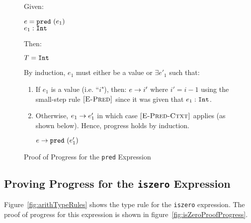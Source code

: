 \documentclass{report}
\newcommand{\rel}[1]{\mbox{\sc [#1]}}
\begin{document}
\begin{figure}[ht!]
Given:
\begin{center}
  $e = \mbox{\tt pred}~(e_1)$ \\
  ${e_1} : {\mbox{\tt Int}}$
\end{center}
Then:~\\
\begin{center}
   $T = \mbox{\tt Int}$
\end{center}

By induction, $e_1$ must either be a value or $\exists e'_1$ such that:~\\

	\begin{enumerate}
    \item If $e_1$ is a value (i.e. ``$i$"), then: ${e} \rightarrow {i'}$ where $i' = i - 1$ using the small-step rule $\rel{E-Pred}$ since it was given that ${e_1} : {\mbox{\tt Int}}$.
    
    \item Otherwise, ${e_1} \rightarrow {e'_1}$ in which case $\rel{E-Pred-Ctxt}$ applies (as shown below). Hence, progress holds by induction.
    
    \begin{center}
      ${e} \rightarrow {\mbox{\tt pred}~(e'_1)}$
    \end{center}
	
	\end{enumerate}
	
  \caption{Proof of Progress for the \texttt{pred} Expression}\label{fig:predProofProgress}
\end{figure}

\subsection{Proving Progress for the \texttt{iszero} Expression}

Figure~\ref{fig:arithTypeRules} shows the type rule for the \texttt{iszero} expression.  The proof of progress for this expression is shown in figure~\ref{fig:isZeroProofProgress}.
\end{document}
